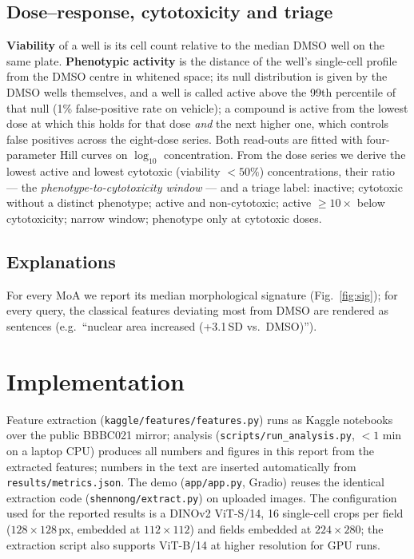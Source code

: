 \documentclass[11pt,a4paper]{article}
\begin{document}
\subsection{Dose--response, cytotoxicity and triage}
\textbf{Viability} of a well is its cell count relative to the median DMSO well on the same plate.
\textbf{Phenotypic activity} is the distance of the well's single-cell profile from the DMSO
centre in whitened space; its null distribution is given by the DMSO wells themselves, and a well
is called active above the 99th percentile of that null (1\% false-positive rate on vehicle);
a compound is active from the lowest dose at which this holds for that dose \emph{and} the next
higher one, which controls false positives across the eight-dose series.
Both read-outs are fitted with four-parameter Hill curves on $\log_{10}$ concentration. From the
dose series we derive the lowest active and lowest cytotoxic (viability $<50\%$) concentrations,
their ratio --- the \emph{phenotype-to-cytotoxicity window} --- and a triage label:
inactive; cytotoxic without a distinct phenotype; active and non-cytotoxic; active
$\geq10\times$ below cytotoxicity; narrow window; phenotype only at cytotoxic doses.

\subsection{Explanations}
For every MoA we report its median morphological signature (Fig.~\ref{fig:sig}); for every query,
the classical features deviating most from DMSO are rendered as sentences (e.g.\ ``nuclear area
increased (+3.1\,SD vs.\ DMSO)'').

\section{Implementation}
Feature extraction (\texttt{kaggle/features/features.py}) runs as Kaggle notebooks over the public
BBBC021 mirror; analysis (\texttt{scripts/run\_analysis.py}, $<1$ min on a laptop CPU) produces
all numbers and figures in this report from the extracted features; numbers in the text are
inserted automatically from \texttt{results/metrics.json}. The demo (\texttt{app/app.py}, Gradio)
reuses the identical extraction code (\texttt{shennong/extract.py}) on uploaded images. The
configuration used for the reported results is a DINOv2 ViT-S/14, 16 single-cell crops per field
($128\times128$\,px, embedded at $112\times112$) and fields embedded at $224\times280$; the
extraction script also supports ViT-B/14 at higher resolution for GPU runs.
\end{document}
